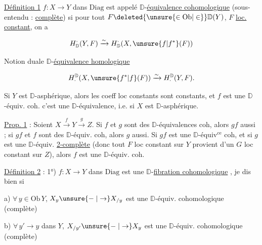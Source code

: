 
\uline{Définition 1} $f:X\to Y$ dans $\mathrm{Diag}$ est appelé $\mathbb D$-\uline{équivalence cohomologique} (sous-entendu : \uline{complète}) si pour tout $F\deleted{\unsure{\in\mathrm{Ob}|\in}}\mathbb D(Y)$, $F$ \uline{loc. constant}, on a

\[
H^{\cdot}_{\mathbb D}(Y,F)\xrightarrow{\sim} H^{\cdot}_{\mathbb D}(X,\unsure{f|f^*}(F))
\]

Notion duale $\mathbb D$-\uline{équivalence homologique}

\[
H^{\mathbb D}_{\cdot}(X,\unsure{f^*|f}(F))\xrightarrow{\sim}H^{\mathbb D}_{\cdot}(Y,F).
\]

Si $Y$ est  $\mathbb D$-asphérique, alors les coeff loc constants  sont constants, et $f$ est une $\mathbb D$-équiv. coh.   c'est une $\mathbb D$-équivalence, i.e. si $X$ est $\mathbb D$-asphérique.


\uline{Prop. 1}  : Soient $X\xrightarrow{f}Y\xrightarrow{g}Z$. Si $f$ et $g$ sont des $\mathbb D$-équivalences coh, alors $gf$ aussi ; si $gf$ et $f$ sont des $\mathbb D$-équiv. coh, alors $g$ aussi. Si $gf$ est une $\mathbb D$-équiv$^{\mathrm{ce}}$ coh, et si $g$ est une $\mathbb D$-équiv. \uline{2-complète} (donc tout $F$ loc constant sur $Y$ provient d'un $G$ loc constant sur $Z$), alors $f$ est une $\mathbb D$-équiv. coh.

\uline{Définition 2} : 1°) $f:X\to Y$ dans $\mathrm{Diag}$ est  une $\mathbb D$-\uline{fibration cohomologique} , je dis bien  si

a) $\forall\,y\in\mathrm{Ob}\,Y$, $X_y\unsure{\relbar|\to}X_{/y}$ est une $\mathbb D$-équiv.  cohomologique (complète)

b) $\forall\,y'\to y$ dans $Y$, $X_{/y'}\unsure{\relbar|\to}X_y$ est une $\mathbb D$-équiv.  cohomologique (complète)


